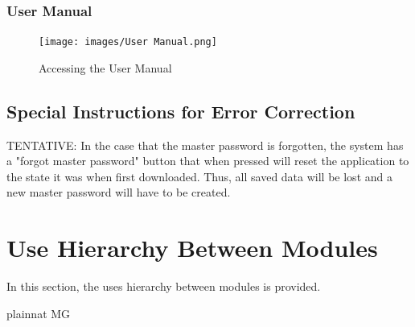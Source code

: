 \documentclass[12pt, titlepage]{article}
\begin{document}
\subsubsection{User Manual} \label{UseMan}

\begin{figure}[h]
	\texttt{[image: images/User Manual.png]}
	\caption{Accessing the User Manual}
	\label{fig:UsMan}
\end{figure}


\subsection{Special Instructions for Error Correction} \label{ErrCorr}

TENTATIVE: In the case that the master password is forgotten, the system has a "forgot master password" button that when pressed will reset the application to the state it was when first downloaded. Thus, all saved data will be lost and a new master password will have to be created.


\section{Use Hierarchy Between Modules} \label{SecUse}

In this section, the uses hierarchy between modules is
provided. \citet{Parnas1978} 



 {plainnat}
 {MG}
\end{document}

